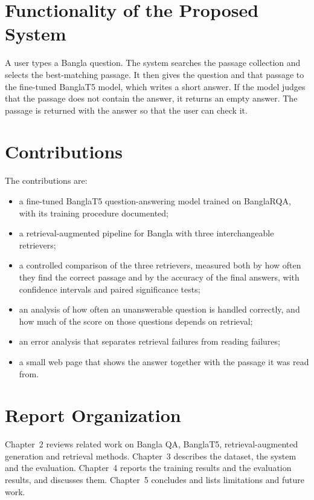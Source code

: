 \section{Functionality of the Proposed System}

A user types a Bangla question. The system searches the passage collection and selects the best-matching passage. It then gives the question and that passage to the fine-tuned BanglaT5 model, which writes a short answer. If the model judges that the passage does not contain the answer, it returns an empty answer. The passage is returned with the answer so that the user can check it.

\section{Contributions}

The contributions are:
\begin{itemize}
	\item a fine-tuned BanglaT5 question-answering model trained on BanglaRQA, with its training procedure documented;
	\item a retrieval-augmented pipeline for Bangla with three interchangeable retrievers;
	\item a controlled comparison of the three retrievers, measured both by how often they find the correct passage and by the accuracy of the final answers, with confidence intervals and paired significance tests;
	\item an analysis of how often an unanswerable question is handled correctly, and how much of the score on those questions depends on retrieval;
	\item an error analysis that separates retrieval failures from reading failures;
	\item a small web page that shows the answer together with the passage it was read from.
\end{itemize}

\section{Report Organization}

Chapter~2 reviews related work on Bangla QA, BanglaT5, retrieval-augmented generation and retrieval methods. Chapter~3 describes the dataset, the system and the evaluation. Chapter~4 reports the training results and the evaluation results, and discusses them. Chapter~5 concludes and lists limitations and future work.
